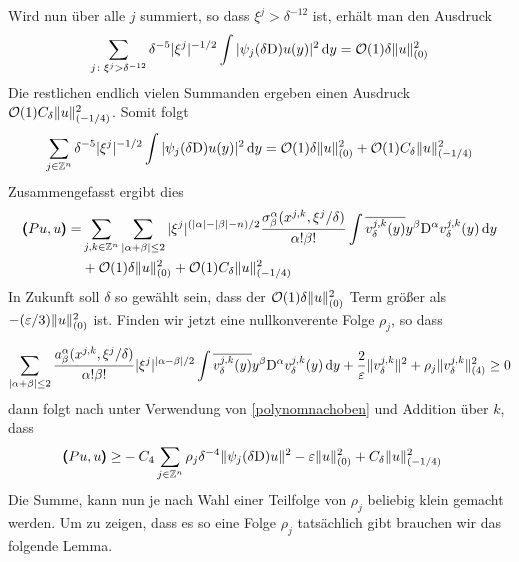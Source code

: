 Wird nun über alle $j$ summiert, so dass $\xi^j>\delta^{-12}$ ist, erhält man den Ausdruck
\begin{align*}
\sum_{j\colon \xi^j>\delta^{-12}} \delta^{-5} |\xi^j|^{-1/2}\int |\psi_j(\delta\mathrm D)u(y)|^2\,\mathrm d y = \mathcal O(1)\delta\lVert u\rVert _{(0)}^2
\end{align*}
Die restlichen endlich vielen Summanden ergeben einen Ausdruck $\mathcal O(1)C_\delta \lVert u\rVert _{(-1/4)}^2$. Somit folgt
\begin{align*}
\sum_{j\in\mathbb Z^n}\delta^{-5} |\xi^j|^{-1/2}\int |\psi_j(\delta\mathrm D)u(y)|^2\,\mathrm d y = \mathcal O(1)\delta\lVert u\rVert _{(0)}^2 + \mathcal O(1)C_\delta \lVert u\rVert _{(-1/4)}^2
\end{align*}
Zusammengefasst ergibt dies
\begin{align*}
\pmb(Pu,u\pmb)
=& \sum_{j,k\in\mathbb Z^n}\sum_{\lvert\alpha+\beta\rvert\le 2}|\xi^j|^{(\lvert\alpha\rvert-\lvert\beta\rvert-n)/2} \frac{\sigma^\alpha_\beta(x^{j,k},\xi^j/\delta)}{\alpha!\beta!}\int\overline{v^{j,k}_\delta(y)}y^\beta\mathrm D^\alpha v^{j,k}_\delta(y)\,\mathrm d y\\
&+\mathcal O(1)\delta\lVert u\rVert _{(0)}^2 + \mathcal O(1)C_\delta \lVert u\rVert _{(-1/4)}^2\nonumber
\end{align*}
In Zukunft soll $\delta$ so gewählt sein, dass der $\mathcal O(1)\delta\lVert u\rVert ^2_{(0)}$ Term größer als $-(\varepsilon/3)\lVert u\rVert ^2_{(0)}$ ist. Finden wir jetzt eine nullkonverente Folge $\rho_j$, so dass

\begin{align*}
\sum_{|\alpha+\beta|\le 2} \frac{a^\alpha_\beta(x^{j,k},\xi^j/\delta)}{\alpha!\beta!}|\xi^j|^{|\alpha-\beta|/2}\int \overline{v^{j,k}_\delta(y)}y^\beta\mathrm D^\alpha v^{j,k}_\delta(y)\,\mathrm d y + \frac{2}{\varepsilon}\lVert v^{j,k}_\delta\rVert^2 + \rho_j \lVert v^{j,k}_\delta\rVert_{(4)}^2 \ge 0
\end{align*}
dann folgt nach unter Verwendung von \eqref{polynomnachoben} und Addition über $k$,  dass 
\begin{align*}
\pmb(Pu,u\pmb)
\ge& -C_4\sum_{j\in\mathbb Z^n} \rho_j \delta^{-4}\lVert\psi_j(\delta\mathrm D)u\rVert^2 - \varepsilon \lVert u\rVert _{(0)}^2 + C_\delta \lVert u\rVert _{(-1/4)}^2\nonumber
\end{align*}
Die Summe, kann nun je nach Wahl einer Teilfolge von $\rho_j$ beliebig klein gemacht werden. Um zu zeigen, dass es so eine Folge $\rho_j$ tatsächlich gibt brauchen wir das folgende Lemma.

